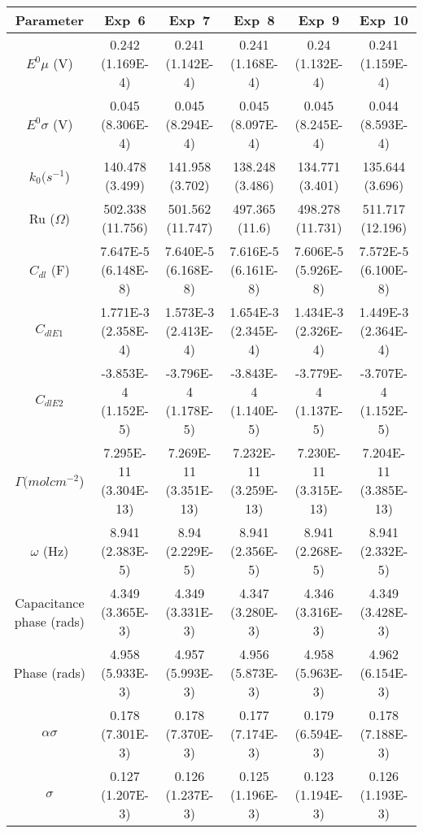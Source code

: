 \documentclass[preview]{standalone}
\begin{document}
\begin{center}
\begin{tabular}{|c|c|c|c|c|c|}
\hline
Parameter & Exp\ 6 & Exp\ 7 & Exp\ 8 & Exp\ 9 & Exp\ 10\\
\hline\hline
$E^0 \mu$ (V) & 0.242 (1.169E-4) & 0.241 (1.142E-4) & 0.241 (1.168E-4) & 0.24 (1.132E-4) & 0.241 (1.159E-4) \\
\hline
$E^0 \sigma$ (V) & 0.045 (8.306E-4) & 0.045 (8.294E-4) & 0.045 (8.097E-4) & 0.045 (8.245E-4) & 0.044 (8.593E-4) \\
\hline
$k_0 (s^{-1}$) & 140.478 (3.499) & 141.958 (3.702) & 138.248 (3.486) & 134.771 (3.401) & 135.644 (3.696) \\
\hline
Ru ($\Omega$) & 502.338 (11.756) & 501.562 (11.747) & 497.365 (11.6) & 498.278 (11.731) & 511.717 (12.196) \\
\hline
$C_{dl}$ (F) & 7.647E-5 (6.148E-8) & 7.640E-5 (6.168E-8) & 7.616E-5 (6.161E-8) & 7.606E-5 (5.926E-8) & 7.572E-5 (6.100E-8) \\
\hline
$C_{dlE1}$& 1.771E-3 (2.358E-4) & 1.573E-3 (2.413E-4) & 1.654E-3 (2.345E-4) & 1.434E-3 (2.326E-4) & 1.449E-3 (2.364E-4) \\
\hline
$C_{dlE2}$& -3.853E-4 (1.152E-5) & -3.796E-4 (1.178E-5) & -3.843E-4 (1.140E-5) & -3.779E-4 (1.137E-5) & -3.707E-4 (1.152E-5) \\
\hline
$\Gamma (mol cm^{-2}$) & 7.295E-11 (3.304E-13) & 7.269E-11 (3.351E-13) & 7.232E-11 (3.259E-13) & 7.230E-11 (3.315E-13) & 7.204E-11 (3.385E-13) \\
\hline
$\omega$ (Hz) & 8.941 (2.383E-5) & 8.94 (2.229E-5) & 8.941 (2.356E-5) & 8.941 (2.268E-5) & 8.941 (2.332E-5) \\
\hline
Capacitance phase (rads) & 4.349 (3.365E-3) & 4.349 (3.331E-3) & 4.347 (3.280E-3) & 4.346 (3.316E-3) & 4.349 (3.428E-3) \\
\hline
Phase (rads) & 4.958 (5.933E-3) & 4.957 (5.993E-3) & 4.956 (5.873E-3) & 4.958 (5.963E-3) & 4.962 (6.154E-3) \\
\hline
$\alpha\sigma$& 0.178 (7.301E-3) & 0.178 (7.370E-3) & 0.177 (7.174E-3) & 0.179 (6.594E-3) & 0.178 (7.188E-3) \\
\hline
$\sigma$& 0.127 (1.207E-3) & 0.126 (1.237E-3) & 0.125 (1.196E-3) & 0.123 (1.194E-3) & 0.126 (1.193E-3) \\
\hline
\end{tabular}
\end{center}
\end{document}
